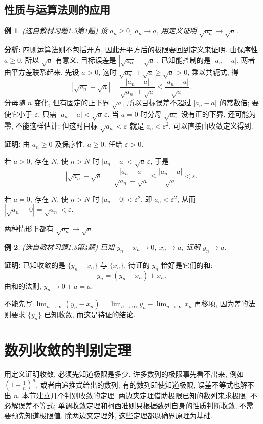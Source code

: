 \documentclass[UTF8,openany]{ctexbook}
\theoremstyle{chinesetextbook}
\newtheorem{example}{例}[section]
\newenvironment{cnproof}{\par\indent\textbf{证明:} \ignorespaces}{\par}
\begin{document}
\subsection{性质与运算法则的应用}
\begin{example}
\textnormal{(选自教材习题1.3第1题)} 设 $a_n\ge0$, $a_n\to a$, 用定义证明 $\sqrt{a_n}\to\sqrt a$.
\end{example}
\par\indent\textbf{分析:} 四则运算法则不包括开方, 因此开平方后的极限要回到定义来证明. 由保序性 $a\ge0$, 所以 $\sqrt a$ 有意义. 目标误差是 $|\sqrt{a_n}-\sqrt a|$, 已知能控制的是 $|a_n-a|$, 两者由平方差联系起来. 先设 $a>0$, 这时 $\sqrt{a_n}+\sqrt a\ge\sqrt a>0$, 乘以共轭式, 得
\[
|\sqrt{a_n}-\sqrt a|=\frac{|a_n-a|}{\sqrt{a_n}+\sqrt a}\le\frac{|a_n-a|}{\sqrt a}.
\]
分母随 $n$ 变化, 但有固定的正下界 $\sqrt a$, 所以目标误差不超过 $|a_n-a|$ 的常数倍; 要使它小于 $\varepsilon$, 只需 $|a_n-a|<\sqrt a\,\varepsilon$. 当 $a=0$ 时分母 $\sqrt{a_n}$ 没有正的下界, 还可能为零, 不能这样估计; 但这时目标 $\sqrt{a_n}<\varepsilon$ 就是 $a_n<\varepsilon^2$, 可以直接由收敛定义得到.
\begin{cnproof}
由 $a_n\ge0$ 及保序性, $a\ge0$. 任给 $\varepsilon>0$.

若 $a>0$, 存在 $N$, 使 $n>N$ 时 $|a_n-a|<\sqrt a\,\varepsilon$, 于是
\[
|\sqrt{a_n}-\sqrt a|=\frac{|a_n-a|}{\sqrt{a_n}+\sqrt a}\le\frac{|a_n-a|}{\sqrt a}<\varepsilon.
\]

若 $a=0$, 存在 $N$, 使 $n>N$ 时 $|a_n-0|<\varepsilon^2$, 即 $a_n<\varepsilon^2$, 从而 $|\sqrt{a_n}-0|=\sqrt{a_n}<\varepsilon$.

两种情形下都有 $\sqrt{a_n}\to\sqrt a$.
\end{cnproof}
\begin{example}
\textnormal{(选自教材习题1.3第4题)} 已知 $y_n-x_n\to0$, $x_n\to a$, 证明 $y_n\to a$.
\end{example}
\begin{cnproof}
已知收敛的是 $\{y_n-x_n\}$ 与 $\{x_n\}$, 待证的 $y_n$ 恰好是它们的和:
\[
y_n=(y_n-x_n)+x_n.
\]
由和的法则, $y_n\to0+a=a$.
\end{cnproof}
不能先写 $\displaystyle\lim_{n\to\infty}(y_n-x_n)=\lim_{n\to\infty}y_n-\lim_{n\to\infty}x_n$ 再移项, 因为差的法则要求 $\{y_n\}$ 已知收敛, 而这是待证的结论.
\section{数列收敛的判别定理}
用定义证明收敛, 必须先知道极限是多少. 许多数列的极限事先看不出来, 例如 $\displaystyle\left(1+\frac1n\right)^n$, 或者由递推式给出的数列; 有的数列即使知道极限, 误差不等式也解不出 $n$. 本节建立几个判别收敛的定理. 两边夹定理借助极限已知的数列来求极限, 不必解误差不等式; 单调收敛定理和柯西准则只根据数列自身的性质判断收敛, 不需要预先知道极限值. 除两边夹定理外, 这些定理都以确界原理为基础.
\end{document}
